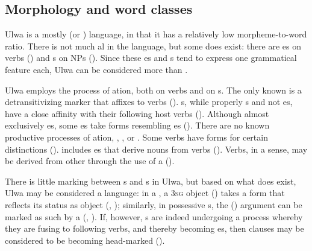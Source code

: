 
\subsection{Morphology and word classes}\label{sec:1.8.2}


Ulwa is a mostly  (or ) language, in that it has a relatively low morpheme-to-word ratio. There is not much al  in the language, but some does exist: there are  es on verbs () and s on NPs (). Since these es and s tend to express one grammatical feature each, Ulwa can be considered more  than .


Ulwa employs the  process of ation, both on verbs and on s. The only known  is a detransitivizing marker that affixes to verbs (). s, while properly s and not es, have a close  affinity with their following host verbs (). Although almost exclusively es, some  es take forms resembling es (). There are no known productive processes of ation, , , or . Some verbs have  forms for certain  distinctions ().  includes  es that  derive nouns from verbs (). Verbs, in a sense, may be derived from other  through the use of a  ().

There is little  marking between s and s in Ulwa, but based on what does exist, Ulwa may be considered a  language: in a , a 3\textsc{sg} object () takes a form that reflects its status as object (, ); similarly, in  possessive s, the  () argument can be marked as such by a  (, ). If, however, s are indeed undergoing a process whereby they are fusing to following verbs, and thereby becoming es, then clauses may be considered to be becoming  head-marked ().

